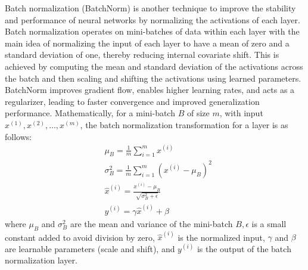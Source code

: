 Batch normalization (BatchNorm) is another technique to improve the stability and performance of neural networks by normalizing the activations of each layer. Batch normalization operates on mini-batches of data within each layer with the main idea of normalizing the input of each layer to have a mean of zero and a standard deviation of one, thereby reducing internal covariate shift. This is achieved by computing the mean and standard deviation of the activations across the batch and then scaling and shifting the activations using learned parameters. BatchNorm improves gradient flow, enables higher learning rates, and acts as a regularizer, leading to faster convergence and improved generalization performance. Mathematically, for a mini-batch $B$ of size $m$, with input $x^{(1)}, x^{(2)}, \ldots, x^{(m)}$, the batch normalization transformation for a layer is as follows:
\begin{equation}
\begin{aligned}
& \mu_B=\frac{1}{m} \sum_{i=1}^m x^{(i)} \\
& \sigma_B^2=\frac{1}{m} \sum_{i=1}^m\left(x^{(i)}-\mu_B\right)^2 \\
& \hat{x}^{(i)}=\frac{x^{(i)}-\mu_B}{\sqrt{\sigma_B^2+\epsilon}} \\
& y^{(i)}=\gamma \hat{x}^{(i)}+\beta
\end{aligned}
\end{equation}
where $\mu_B$ and $\sigma_B^2$ are the mean and variance of the mini-batch $B, \epsilon$ is a small constant added to avoid division by zero, $\hat{x}^{(i)}$ is the normalized input, $\gamma$ and $\beta$ are learnable parameters (scale and shift), and $y^{(i)}$ is the output of the batch normalization layer.
